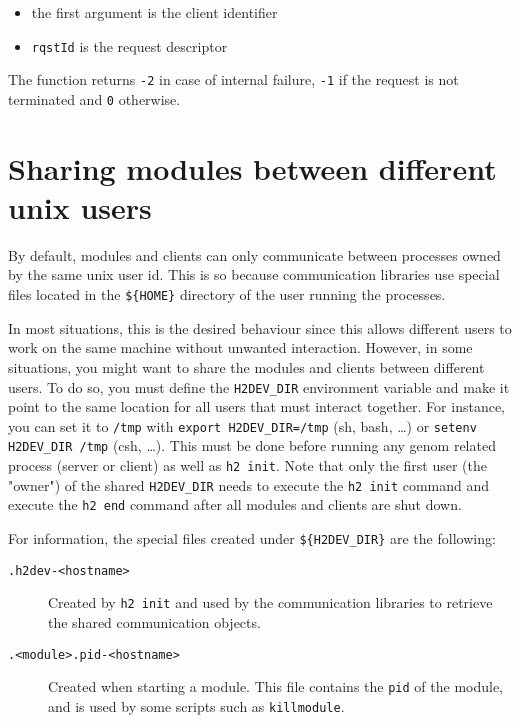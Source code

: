 \begin{itemize}
\item the first argument is the client identifier
\item \texttt{rqstId} is the request descriptor
\end{itemize}

The function returns \texttt{-2} in case of internal failure, \texttt{-1} if
the request is not terminated and \texttt{0} otherwise.


\section{Sharing modules between different unix users}
\label{sec|h2devdir}

By default, modules and clients can only communicate between processes owned by
the same unix user id. This is so because communication libraries use special
files located in the \texttt{\$\{HOME\}} directory of the user running the
processes.

In most situations, this is the desired behaviour since this allows different
users to work on the same machine without unwanted interaction. However, in
some situations, you might want to share the modules and clients between
different users. To do so, you must define the \texttt{H2DEV\_DIR} environment
variable and make it point to the same location for all users that must
interact together. For instance, you can set it to \texttt{/tmp} with
\texttt{export H2DEV\_DIR=/tmp} (sh, bash, \ldots) or \texttt{setenv H2DEV\_DIR
/tmp} (csh, \ldots). This must be done before running any genom related process
(server or client) as well as \texttt{h2 init}. Note that only the first user
(the "owner") of the shared \texttt{H2DEV\_DIR} needs to execute the \texttt{h2
init} command and execute the \texttt{h2 end} command after all modules and
clients are shut down.

For information, the special files created under \texttt{\$\{H2DEV\_DIR\}} are
the following:
\begin{description}
   \item[\texttt{.h2dev-<hostname>}] Created by \texttt{h2 init} and used by
   the communication libraries to retrieve the shared communication objects.

   \item[\texttt{.<module>.pid-<hostname>}] Created when starting a \GenoM{}
   module. This file contains the \texttt{pid} of the module, and is used by
   some scripts such as \texttt{killmodule}.
\end{description}
